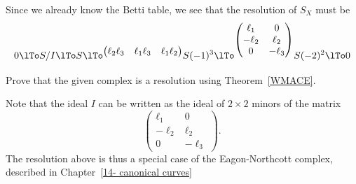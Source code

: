 \begin{example}
 Since we already know the Betti table, we see that the resolution
 of $S_{X}$ must be
$$
0\lTo S/I\lTo S
\lTo^{\begin{pmatrix}
\ell_2\ell_3&\ell_1\ell_3&\ell_1\ell_2
\end{pmatrix}}
 S(-1)^3
 \lTo^{\begin{pmatrix}
  \ell_1&0\\
  -\ell_2&\ell_2\\
 0&-\ell_3
 \end{pmatrix}}
 S(-2)^2
 \lTo 0
$$
\begin{exercise}
Prove that the given complex is a resolution using Theorem~\ref{WMACE}.
\end{exercise}
 
Note that the
ideal $I$ can be written as the ideal of $2\times 2$ minors of the matrix
$$
 {\begin{pmatrix}
  \ell_1&0\\
  -\ell_2&\ell_2\\
 0&-\ell_3
 \end{pmatrix}}.
$$
The resolution above is thus a special case of the Eagon-Northcott complex, described in Chapter~\ref{14- canonical curves}
\end{example}

